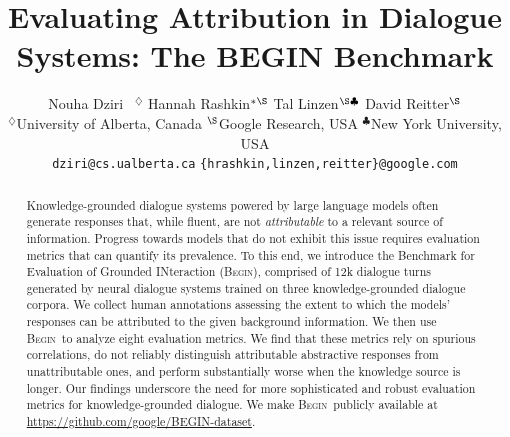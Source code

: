 \documentclass[11pt,a4paper]{article}
\title{Evaluating Attribution in Dialogue Systems: The BEGIN Benchmark
}
\author{
  Nouha Dziri\hspace*{.4mm}\Thanks{Equal Contribution.}\hspace*{.4mm}\ \Thanks{Work done while at Google Research.}\hspace*{.2mm} $^{\diamondsuit}$ \quad Hannah Rashkin$^{*\hspace*{.1mm}\S}$ \quad Tal Linzen$^{\S\hspace*{.15mm}\clubsuit}$ \quad David Reitter$^\S$
   \\
  $^\diamondsuit$University of Alberta, Canada \quad $^\S$Google Research, USA \quad $^\clubsuit$New York University, USA  \\
  \texttt{dziri@cs.ualberta.ca} \quad
  { \tt \{hrashkin,linzen,reitter\}@google.com} 
 }
\date{}
\theoremstyle{remark}
\newcommand{\BEGIN}{\textsc{Begin}}
\newcommand{\begindata}{\BEGIN}
\begin{document}
\setlength{\textfloatsep}{10pt plus 2.0pt minus 4.0pt}

\setlength{\Extopsep}{0.2\baselineskip}
\setlength{\Exredux}{0\baselineskip}
\setlength{\Exlabelwidth}{1em}%



\maketitle
\begin{abstract}
Knowledge-grounded dialogue systems powered by large language models often generate responses that, while fluent, are not \textit{attributable} to a relevant source of information. Progress towards models that do not exhibit this issue requires evaluation metrics that can quantify its prevalence. To this end, we introduce the Benchmark for Evaluation of Grounded INteraction (\begindata), comprised of 12k dialogue turns generated by neural dialogue systems trained on three knowledge-grounded dialogue corpora. We collect human annotations assessing the extent to which the models' responses can be attributed to the given background information. We then use \begindata\ to analyze eight evaluation metrics. We find that these metrics rely on spurious correlations, do not reliably distinguish attributable abstractive responses from unattributable ones, and perform substantially worse when the knowledge source is longer. Our findings underscore the need for more sophisticated and robust evaluation metrics for knowledge-grounded dialogue. We make \begindata \ publicly available at \url{https://github.com/google/BEGIN-dataset}. 






\end{abstract}













\clearpage









    


\end{document}
